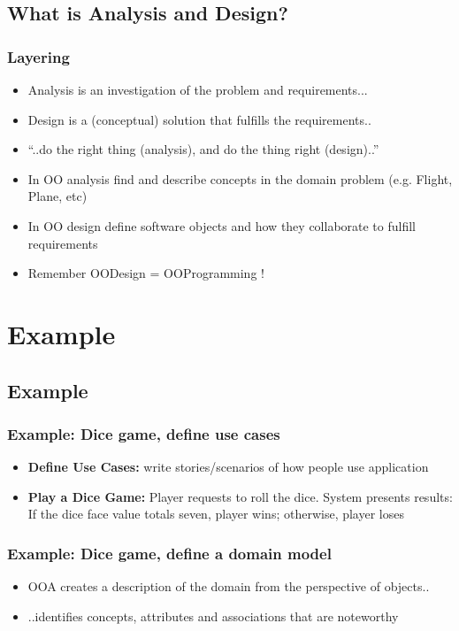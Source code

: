 \documentclass{beamer}
\begin{document}
\subsection{What is Analysis and Design?}
\begin{frame}
	\frametitle{Layering}
  	\begin{itemize}
	\item<+-> Analysis is an investigation of the problem and requirements...
	\item<+-> Design is a (conceptual) solution that fulfills the requirements.. 
	\item<+-> ``..do the right thing (analysis), and do the thing right (design)..''
	\item<+-> In OO analysis find and describe concepts in the domain problem (e.g. Flight, Plane, etc)
	\item<+-> In OO design define software objects and how they collaborate to fulfill requirements
	\item<+-> Remember OODesign = OOProgramming !
   \end{itemize}
\end{frame}

\section{Example}
\subsection{Example}
\begin{frame}
	\frametitle{Example: Dice game, define use cases}
	\begin{itemize}
	\item<+-> \textbf{Define Use Cases:} write stories/scenarios of how people use application
	\item<+-> \textbf{Play a Dice Game:}  Player requests to roll the dice. System presents results: If the dice face value totals seven, player wins; otherwise, player loses 
   \end{itemize}
\end{frame}

\begin{frame}
	\frametitle{Example: Dice game, define a domain model}
	\begin{itemize}
	\item<+-> OOA creates a description of the domain from the perspective of objects..
	\item<+-> ..identifies concepts, attributes and associations that are noteworthy
   \end{itemize}
\end{frame}
\end{document}
